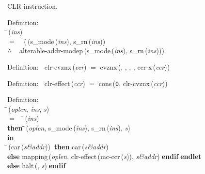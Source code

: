  CLR instruction.
\begin{tabbing}{\sc Definition}: \\  
\=\,({\it{ins\/}}) \\ 
$=$$\;\;\;\;$(\=\,({\rm{s\_mode}}\,({\it{ins\/}}), {\rm{s\_rn}}\,({\it{ins\/}})) \\ 
$\wedge$$\;\;\;\;${\rm{alterable-addr-modep}}\,({\rm{s\_mode}}\,({\it{ins\/}}), {\rm{s\_rn}}\,({\it{ins\/}})))\-\-
\end{tabbing}

\begin{tabbing}{\sc Definition}:$\;\;$
{\rm{clr-cvznx}}\,({\it{ccr\/}}) $=$ {\rm{cvznx}}\,({}, {}, {}, {}, {\rm{ccr-x}}\,({\it{ccr\/}}))
\end{tabbing}

\begin{tabbing}{\sc Definition}:$\;\;$
{\rm{clr-effect}}\,({\it{ccr\/}}) $=$ {\rm{cons}}\,({\tt{0}}, {\rm{clr-cvznx}}\,({\it{ccr\/}}))
\end{tabbing}

\begin{tabbing}{\sc Definition}: \\  
\=\,({\it{oplen\/}}, {\it{ins\/}}, {\it{s\/}}) \\ 
$=$$\;\;\;\;$\=\,({\it{ins\/}}) \\ 
{\bf then }\=\=\,({\it{oplen\/}}, {\rm{s\_mode}}\,({\it{ins\/}}), {\rm{s\_rn}}\,({\it{ins\/}}), {\it{s\/}})\- \\ 
{\bf in} \\ 
\=\,({\rm{car}}\,({\it{s\&addr\/}}))$\;\;${\bf then }{\rm{car}}\,({\it{s\&addr\/}}) \\ 
{\bf else }{\rm{mapping}}\,({\it{oplen\/}}, {\rm{clr-effect}}\,({\rm{mc-ccr}}\,({\it{s\/}})), {\it{s\&addr\/}})$\;${\bf  endif}\-$\;${\bf  endlet}\- \\ 
{\bf else }{\rm{halt}}\,({}, {\it{s\/}})$\;${\bf  endif}\-\-
\end{tabbing}

